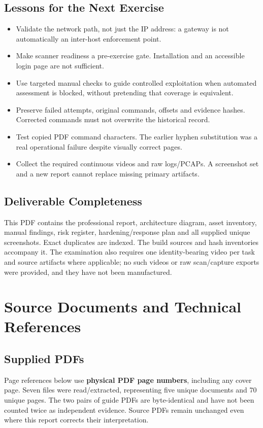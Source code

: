 \documentclass[11pt,a4paper]{article}
\newcommand{\partheading}[2]{\clearpage\noindent{\small\bfseries\color{steel}#1}\par\section{#2}}
\begin{document}
\subsection{Lessons for the Next Exercise}
\begin{itemize}
\item Validate the network path, not just the IP address: a gateway is not automatically an inter-host enforcement point.
\item Make scanner readiness a pre-exercise gate. Installation and an accessible login page are not sufficient.
\item Use targeted manual checks to guide controlled exploitation when automated assessment is blocked, without pretending that coverage is equivalent.
\item Preserve failed attempts, original commands, offsets and evidence hashes. Corrected commands must not overwrite the historical record.
\item Test copied PDF command characters. The earlier hyphen substitution was a real operational failure despite visually correct pages.
\item Collect the required continuous videos and raw logs/PCAPs. A screenshot set and a new report cannot replace missing primary artifacts.
\end{itemize}

\subsection{Deliverable Completeness}
This PDF contains the professional report, architecture diagram, asset inventory, manual findings, risk register, hardening/response plan and all supplied unique screenshots. Exact duplicates are indexed. The build sources and hash inventories accompany it. The examination also requires one identity-bearing video per task and source artifacts where applicable; no such videos or raw scan/capture exports were provided, and they have not been manufactured.

\partheading{09 / REFERENCES}{Source Documents and Technical References}
\label{sec:sources}
\subsection{Supplied PDFs}
Page references below use \textbf{physical PDF page numbers}, including any cover page. Seven files were read/extracted, representing five unique documents and 70 unique pages. The two pairs of guide PDFs are byte-identical and have not been counted twice as independent evidence. Source PDFs remain unchanged even where this report corrects their interpretation.
\end{document}
